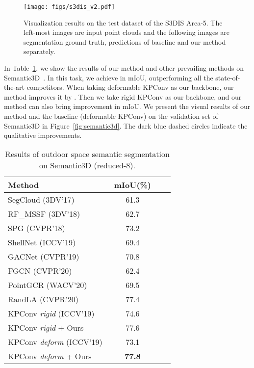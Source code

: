 \documentclass[final]{cvpr}
\begin{document}
\begin{figure}[ht]
    \centering
    \texttt{[image: figs/s3dis\_v2.pdf]}
    \caption{Visualization results on the test dataset of the S3DIS Area-5. The left-most images are input point clouds and the following images are segmentation ground truth, predictions of baseline and our method separately.}
    \label{fig:s3dis}
\end{figure}

In Table~\ref{tab:semantic3d}, we show the results of our method and other prevailing methods on Semantic3D~\cite{hackel2017semantic3d}. In this task, we achieve  in mIoU, outperforming all the state-of-the-art competitors. When taking deformable KPConv as our backbone, our method improves it by . Then we take rigid KPConv as our backbone, and our method can also bring  improvement in mIoU. We present the visual results of our method and the baseline (deformable KPConv) on the validation set of Semantic3D in Figure~\ref{fig:semantic3d}. The dark blue dashed circles indicate the qualitative improvements.

\begin{table}
\centering
\begin{tabular}{lccc}  
\toprule
Method  & mIoU(\%) \\
\midrule
SegCloud ({\color{blue}3DV'17})~\cite{tchapmi2017segcloud} & 61.3\\
RF\_MSSF ({\color{blue}3DV'18})~\cite{thomas2018semantic} & 62.7\\
SPG ({\color{blue}CVPR'18})~\cite{landrieu2018large} & 73.2\\
ShellNet ({\color{blue}ICCV'19})~\cite{zhang2019shellnet} & 69.4\\
GACNet ({\color{blue}CVPR'19})~\cite{wang2019graph} & 70.8\\
FGCN ({\color{blue}CVPR'20})~\cite{khan2020fgcn} & 62.4\\
PointGCR ({\color{blue}WACV'20})~\cite{ma2020global} & 69.5\\
RandLA ({\color{blue}CVPR'20})~\cite{hu2020randla} & 77.4\\
\midrule
KPConv \textit{rigid} ({\color{blue}ICCV'19})~\cite{thomas2019kpconv} & 74.6\\
KPConv \textit{rigid} + Ours & 77.6\\
\midrule
KPConv \textit{deform} ({\color{blue}ICCV'19})~\cite{thomas2019kpconv} & 73.1\\
KPConv \textit{deform} + Ours & \textbf{77.8}\\
\bottomrule
\end{tabular}
\caption{Results of outdoor space semantic segmentation on Semantic3D (reduced-8).}
\label{tab:semantic3d}
\end{table}
\end{document}
